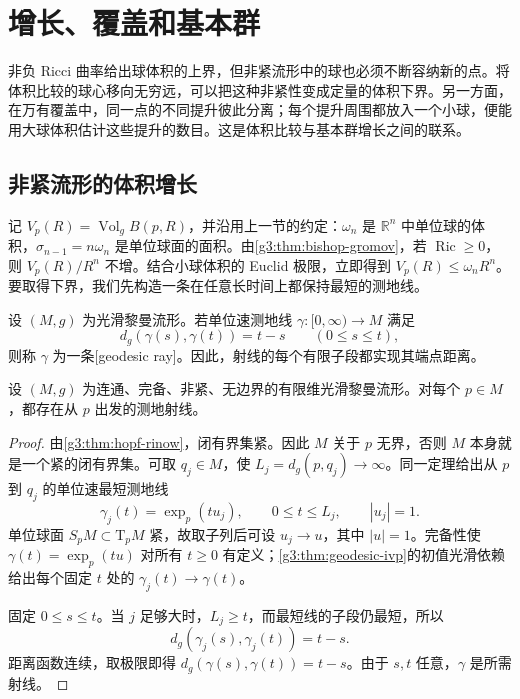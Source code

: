 
% 
% 

\section{增长、覆盖和基本群}
\label{g3:sec:0803}

非负 Ricci 曲率给出球体积的上界，但非紧流形中的球也必须不断容纳新的点。将体积比较的球心移向无穷远，可以把这种非紧性变成定量的体积下界。另一方面，在万有覆盖中，同一点的不同提升彼此分离；每个提升周围都放入一个小球，便能用大球体积估计这些提升的数目。这是体积比较与基本群增长之间的联系。

\subsection{非紧流形的体积增长}
\label{g3:subsec:0803:01}

记 \(V_p(R)=\operatorname{Vol}_g B(p,R)\)，并沿用上一节的约定：\(\omega_n\) 是 \(\mathbb R^n\) 中单位球的体积，\(\sigma_{n-1}=n\omega_n\) 是单位球面的面积。由\cref{g3:thm:bishop-gromov}，若 \(\operatorname{Ric}\ge0\)，则 \(V_p(R)/R^n\) 不增。结合小球体积的 Euclid 极限，立即得到 \(V_p(R)\le\omega_nR^n\)。要取得下界，我们先构造一条在任意长时间上都保持最短的测地线。

\begin{definition}\label{g3:def:geodesic-ray}
	设 \((M,g)\) 为光滑黎曼流形。若单位速测地线 \(\gamma:[0,\infty)\to M\) 满足
	\[
		d_g(\gamma(s),\gamma(t))=t-s
		\qquad(0\le s\le t),
	\]
	则称 \(\gamma\) 为一条[geodesic ray]。因此，射线的每个有限子段都实现其端点距离。
\end{definition}

\begin{lemma}\label{g3:lem:complete-noncompact-ray}
	设 \((M,g)\) 为连通、完备、非紧、无边界的有限维光滑黎曼流形。对每个 \(p\in M\)，都存在从 \(p\) 出发的测地射线。
\end{lemma}
\begin{proof}
	由\cref{g3:thm:hopf-rinow}，闭有界集紧。因此 \(M\) 关于 \(p\) 无界，否则 \(M\) 本身就是一个紧的闭有界集。可取 \(q_j\in M\)，使 \(L_j=d_g(p,q_j)\to\infty\)。同一定理给出从 \(p\) 到 \(q_j\) 的单位速最短测地线
	\[
		\gamma_j(t)=\exp_p(tu_j),\qquad
		0\le t\le L_j,\qquad |u_j|=1.
	\]
	单位球面 \(S_pM\subset\mathrm T_pM\) 紧，故取子列后可设 \(u_j\to u\)，其中 \(|u|=1\)。完备性使 \(\gamma(t)=\exp_p(tu)\) 对所有 \(t\ge0\) 有定义；\cref{g3:thm:geodesic-ivp}的初值光滑依赖给出每个固定 \(t\) 处的 \(\gamma_j(t)\to\gamma(t)\)。

	固定 \(0\le s\le t\)。当 \(j\) 足够大时，\(L_j\ge t\)，而最短线的子段仍最短，所以
	\[
		d_g(\gamma_j(s),\gamma_j(t))=t-s.
	\]
	距离函数连续，取极限即得 \(d_g(\gamma(s),\gamma(t))=t-s\)。由于 \(s,t\) 任意，\(\gamma\) 是所需射线。
\end{proof}


